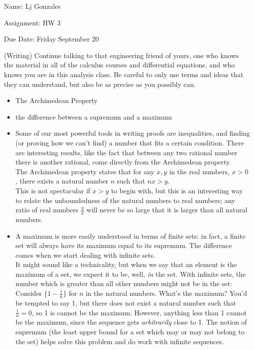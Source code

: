 \documentclass[11 pt]{article}
\begin{document}
    Name: Lj Gonzales

    Assignment: HW 3 

    Due Date: Friday September 20
    \break

\begin{problem}
	(Writing) Continue talking to that engineering friend of yours, one who knows the material in all of the calculus courses and differential equations, and who knows you are in this analysis class. Be careful to only use terms and ideas that they can understand, but also be as precise as you possibly can.
	\begin{itemize}
		\item The Archimedean Property
		\item the difference between a supremum and a maximum
	\end{itemize}
\end{problem}
\begin{solution}
	\begin{itemize}
		\item Some of our most powerful tools in writing proofs are inequalities, and finding (or proving how we can't find) a number that fits a certain condition. There are interesting results, like the fact that between any two rational number there is another rational, come directly from the Archimedean property. \\
			The Archimedean property states that for any $x,y$ in the real numbers,  $x>0$, there exists a natural number $n$ such that $nx>y$.\\
			This is not spectacular if $x>y$ to begin with, but this is an interesting way to relate the unboundedness of the natural numbers to real numbers; any ratio of real numbers $\frac{y}{x}$ will never be so large that it is larger than all natural numbers.
		\item A maximum is more easily understood in terms of finite sets: in fact, a finite set will always have its maximum equal to its supremum. The difference comes when we start dealing with infinite sets.\\
		It might sound like a technicality, but when we say that an element is the maximum of a set, we expect it to be, well, \emph{in} the set.
		With infinite sets, the number which is greater than all other numbers might not be in the set: Consider $\{1-\frac{1}{n}\}$ for $n$ in the natural numbers. What's the maximum? You'd be tempted to say 1, but there does not exist a natural number such that $\frac{1}{n}=0$, so 1 is cannot be the maximum. However, anything less than 1 cannot be the maximum, since the sequence gets \emph{arbitrarily} close to 1.
		The notion of supremum (the least upper bound for a set which may or may not belong to the set) helps solve this problem and do work with infinite sequences.
	\end{itemize}
\end{solution} 
\end{document}

